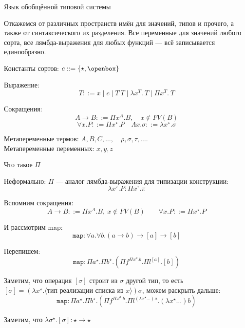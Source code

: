 \documentclass[aspectratio=169]{beamer}
\begin{document}
\begin{frame}{Язык обобщённой типовой системы}

Откажемся от различных пространств имён для значений, типов и прочего, 
а также от синтаксического их разделения. Все переменные для значений
любого сорта, все лямбда-выражения для любых функций --- всё записывается
единообразно.

\begin{dfn}
Константы сортов: $c ::= \{\star,\openbox\}$

Выражение:
$$T ::= x \mid c \mid T\ T \mid \lambda x^T.\ T \mid \Pi x^T.\ T$$\vspace{-0.5cm}

Сокращения:
$$A \rightarrow B ::= \Pi x^A.B,\quad x \notin FV(B)$$
$$\forall x.P ::= \Pi x^\star.P\quad\Lambda x.\sigma ::= \lambda x^\star.\sigma$$

Метапеременные термов: $A,B,C,\dots,\quad \rho,\sigma,\tau,\dots$. \\
Метапеременные переменных: $x,y,z$
\end{dfn}


\end{frame}

\begin{frame}{Что такое $\Pi$}

Неформально: $\Pi$ --- аналог лямбда-выражения для типизации конструкции: $$\lambda x^\tau.P : \Pi x^\tau.\pi$$

Вспомним сокращения:
$$A \rightarrow B ::= \Pi x^A.B,\ x \notin FV(B)\qquad\forall x.P ::= \Pi x^\star.P$$

И рассмотрим map:
$$\texttt{map} : \forall a.\forall b.(a \rightarrow b) \rightarrow [a]  \rightarrow[b]$$

Перепишем:
$$\texttt{map} : \Pi a^\star.\Pi b^\star.(\Pi f^{\Pi x^a.b}.\Pi l^{[a]}.[b])$$

Заметим, что операция $[\sigma]$ строит из $\sigma$ другой тип, то есть
$[\sigma] = (\lambda x^\star.\langle\text{тип реализации списка из }x\rangle) \sigma$, можем раскрыть дальше:
$$\texttt{map} : \Pi a^\star.\Pi b^\star.(\Pi f^{\Pi x^a.b}.\Pi l^{(\lambda x^\star\dots) a}.(\lambda x^\star\dots)b)$$

Заметим, что $\lambda \sigma^\star.[\sigma] : \star\rightarrow\star$

\end{frame}
\end{document}
